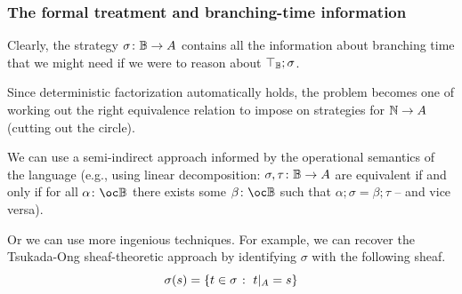 \documentclass{beamer}
\begin{document}
\begin{frame}
  \frametitle{The formal treatment and branching-time information}

  Clearly, the strategy $\sigma\colon\mathbb{B}\to A$ contains all the information about branching time that we might need if we were to reason about $\top_{\mathbb{B}};\sigma$.
  \pause

  Since deterministic factorization automatically holds, the problem becomes one of working out the right equivalence relation to impose on strategies for $\mathbb{N}\to A$ (cutting out the circle).
  \pause

  We can use a semi-indirect approach informed by the operational semantics of the language (e.g., using linear decomposition: $\sigma,\tau\colon\mathbb{B}\to A$ are equivalent if and only if for all $\alpha\from\oc\bB$ there exists some $\beta\from\oc\bB$ such that $\alpha;\sigma=\beta;\tau$ -- and vice versa).
  \pause

  Or we can use more ingenious techniques.  
  For example, we can recover the Tsukada-Ong sheaf-theoretic approach by identifying $\sigma$ with the following sheaf.
  \[
    \sigma(s) = \{t\in\sigma\;\colon\; t\vert_A=s\}
    \]
\end{frame}
\end{document}
